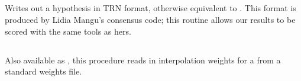 \subsection{}

Writes out a hypothesis in TRN format, otherwise equivalent to
. This format is produced by Lidia Mangu's
consensus code; this routine allows our results to be scored with the
same tools as hers.

\subsection{}

Also available as , this procedure
reads in interpolation weights for a  from a
standard weights file.

